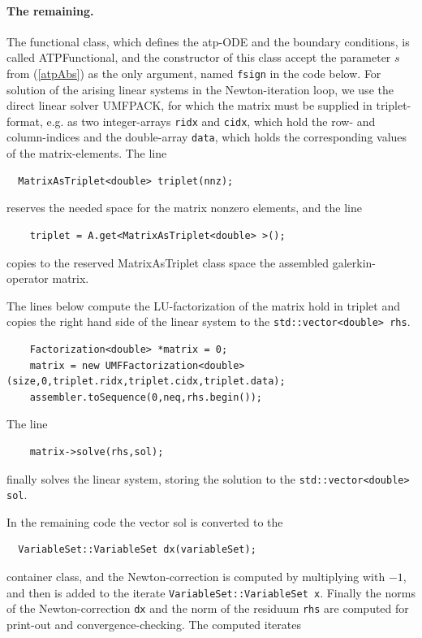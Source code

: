 \documentclass[11pt]{article}
\begin{document}
\paragraph{The remaining.}
The functional class, which defines the atp-ODE and the boundary conditions, is called 
ATPFunctional, and the constructor of this class accept the parameter $s$ from (\ref{atpAbs}) as the
only argument, named {\tt fsign} in the code below. For solution of the arising linear systems in the 
Newton-iteration loop, we use the direct linear solver UMFPACK, for which the matrix must be supplied in triplet-format, e.g. as two integer-arrays {\tt ridx} and {\tt cidx}, which hold the row- and column-indices
and the double-array {\tt data}, which holds the corresponding values of the matrix-elements. The line
\begin{lstlisting}
  MatrixAsTriplet<double> triplet(nnz);
\end{lstlisting}
reserves the needed space for the matrix nonzero elements, and the line
\begin{lstlisting}
    triplet = A.get<MatrixAsTriplet<double> >();
\end{lstlisting}
copies to the reserved MatrixAsTriplet class space the assembled galerkin-operator matrix. \par
\noindent The lines below compute the LU-factorization of the matrix hold in triplet and copies the right 
hand side of the linear system to the {\tt std::vector<double> rhs}. 
\begin{lstlisting}
    Factorization<double> *matrix = 0;
    matrix = new UMFFactorization<double>(size,0,triplet.ridx,triplet.cidx,triplet.data);
    assembler.toSequence(0,neq,rhs.begin());
\end{lstlisting}
The line 
\begin{lstlisting}
    matrix->solve(rhs,sol);
\end{lstlisting}
finally solves the linear system, storing the solution to the {\tt std::vector<double> sol}. \par \noindent
In the remaining code the vector sol is converted to the
\begin{lstlisting}
  VariableSet::VariableSet dx(variableSet);
\end{lstlisting}
container class, and the Newton-correction is computed by multiplying with $-1$, and then is added to
the iterate {\tt VariableSet::VariableSet x}. Finally the norms of the Newton-correction {\tt dx} and the 
norm of the residuum {\tt rhs} are computed for print-out and convergence-checking. The computed iterates 
\end{document}
